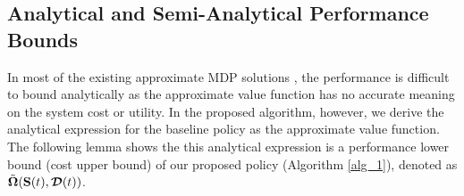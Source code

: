 \subsection{Analytical and Semi-Analytical Performance Bounds}
\label{subsec:analysis}
In most of the existing approximate MDP solutions \cite{mdp-bound1,mdp-bound2,mdp-bound3}, the performance is difficult to bound analytically as the approximate value function has no accurate meaning on the system cost or utility.
In the proposed algorithm, however, we derive the analytical expression for the baseline policy as the approximate value function.
The following lemma shows the this analytical expression is a performance lower bound (cost upper bound) of our proposed policy (Algorithm \ref{alg_1}), {denoted as $\tilde{\boldsymbol{\Omega}}(\mathbf{S}(t), \boldsymbol{\mathcal{D}}(t))$}.
